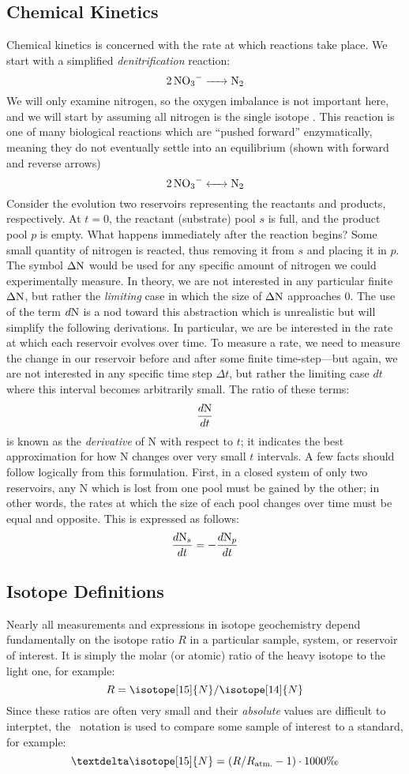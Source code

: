 \documentclass[12pt, twocolumn]{article}
\begin{document}
\subsection*{Chemical Kinetics}
Chemical kinetics is concerned with the rate at which reactions take place. We start with a simplified \emph{denitrification} reaction:
\[\ce{2NO3- -> N2}\]
We will only examine nitrogen, so the oxygen imbalance is not important here, and we will start by assuming all nitrogen is the single isotope . This reaction is one of many biological reactions which are ``pushed forward'' enzymatically, meaning they do not eventually settle into an equilibrium (shown with forward and reverse arrows)
\[\ce{2NO3- <-> N2}\]
Consider the evolution two reservoirs representing the reactants and products, respectively. At $t=0$, the reactant (substrate) pool $s$ is full, and the product pool $p$ is empty. What happens immediately after the reaction begins? Some small quantity of nitrogen is reacted, thus removing it from $s$ and placing it in $p$. The symbol $\Delta\ce{N}$ would be used for any specific amount of nitrogen we could experimentally measure. In theory, we are not interested in any particular finite $\Delta\ce{N}$, but rather the \emph{limiting} case in which the size of $\Delta\ce{N}$ approaches 0. The use of the term $d\ce{N}$ is a nod toward this abstraction which is unrealistic but will simplify the following derivations. In particular, we are be interested in the rate at which each reservoir evolves over time. To measure a rate, we need to measure the change in our reservoir before and after some finite time-step---but again, we are not interested in any specific time step $\Delta t$, but rather the limiting case $dt$ where this interval becomes arbitrarily small. The ratio of these terms:
\[\frac{d\ce{N}}{dt}\]
is known as the \emph{derivative} of N with respect to $t$; it indicates the best approximation for how N changes over very small $t$ intervals. A few facts should follow logically from this formulation. First, in a closed system of only two reservoirs, any N which is lost from one pool must be gained by the other; in other words, the rates at which the size of each pool changes over time must be equal and opposite. This is expressed as follows:
\[\frac{d\ce{N_s}}{dt}=-\frac{d\ce{N_p}}{dt}\]
\subsection*{Isotope Definitions}
Nearly all measurements and expressions in isotope geochemistry depend fundamentally on the isotope ratio $R$ in a particular sample, system, or reservoir of interest. It is simply the molar (or atomic) ratio of the heavy isotope to the light one, for example:
\[R=\isotope[15]{N}/\isotope[14]{N}\]
Since these ratios are often very small and their \emph{absolute} values are difficult to interptet, the \textdelta\ notation is used to compare some sample of interest to a standard, for example:
\[\text{\textdelta}\isotope[15]{N}=(R/R_\text{atm.}-1)\cdot1000 \text{\textperthousand}\]
\end{document}
